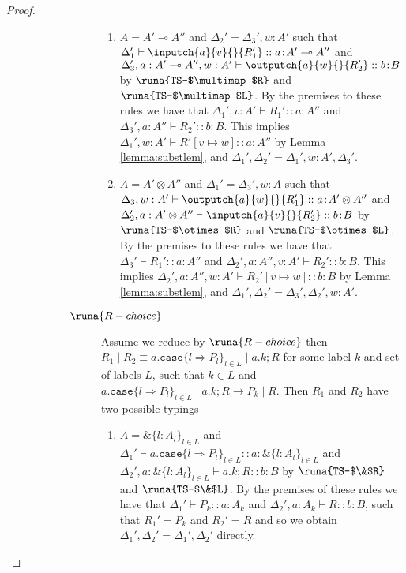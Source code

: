 \begin{theorem}
\begin{proof}
\begin{description}
\begin{description}
\begin{description}
\begin{enumerate}
    \item $A=A'\multimap A''$ and $\Delta_2'=\Delta_3',w:A'$ such that $\Delta_1' \vdash \inputch{a}{v}{}{R_1'} :: a\!:\!A' \multimap A''$ and $\Delta_3',a : A'\multimap A'', w : A' \vdash \outputch{a}{w}{}{R_2'} :: b\!:\!B$ by $\runa{TS-$\multimap$R}$ and $\runa{TS-$\multimap$L}$. By the premises to these rules we have that $\Delta_1',v : A' \vdash R_1' :: a\!:\!A''$ and $\Delta_3',a:A''\vdash R_2' :: b\!:\!B$. This implies $\Delta_1',w : A'\vdash R'[v\mapsto w] :: a\!:\!A''$ by Lemma \ref{lemma:substlem}, and $\Delta_1',\Delta_2'=\Delta_1',w:A',\Delta_3'$. %
    
    
    \item $A=A'\otimes A''$ and $\Delta_1'=\Delta_3',w:A$ such that $\Delta_3,w:A' \vdash \outputch{a}{w}{}{R_1'} :: a\!:\!A'\otimes A''$ and $\Delta_2',a : A'\otimes A''\vdash \inputch{a}{v}{}{R_2'} :: b\!:\!B$ by $\runa{TS-$\otimes$R}$ and $\runa{TS-$\otimes$L}$. By the premises to these rules we have that $\Delta_3'\vdash R_1' :: a\!:\!A''$ and $\Delta_2',a:A'',v:A'\vdash R_2' :: b\!:\!B$. This implies $\Delta_2',a:A'',w:A'\vdash R_2'[v\mapsto w] :: b\!:\!B$ by Lemma \ref{lemma:substlem}, and $\Delta_1',\Delta_2'=\Delta_3',\Delta_2',w:A'$. %
\end{enumerate}
    
    
    
    \item[$\runa{R-choice}$] Assume we reduce by $\runa{R-choice}$ then $R_1 \mid R_2 \equiv a.\texttt{case}\{ l \Rightarrow P_l \}_{l\in L} \mid a.k; R$ for some label $k$ and set of labels $L$, such that $k\in L$ and $a.\texttt{case}\{ l \Rightarrow P_l \}_{l\in L} \mid a.k; R \longrightarrow P_k \mid R$. Then $R_1$ and $R_2$ have two possible typings
\begin{enumerate}
    \item $A=\&\{l : A_l\}_{l\in L}$ and $\Delta_1'\vdash a.\texttt{case}\{l \Rightarrow P_l\}_{l\in L} :: a\!:\!\&\{l : A_l\}_{l\in L}$ and $\Delta_2', a : \&\{l : A_l\}_{l\in L}\vdash a.k; R :: b\!:\!B$ by $\runa{TS-$\&$R}$ and $\runa{TS-$\&$L}$. By the premises of these rules we have that $\Delta_1' \vdash P_k :: a\!:\!A_k$ and $\Delta_2',a : A_k\vdash R :: b\!:\!B$, such that $R_1' = P_k$ and $R_2'=R$ and so we obtain $\Delta_1',\Delta_2'=\Delta_1',\Delta_2'$ directly.
        

\end{enumerate}
\end{description}
\end{description}
\end{description}
\end{proof}
\end{theorem}
